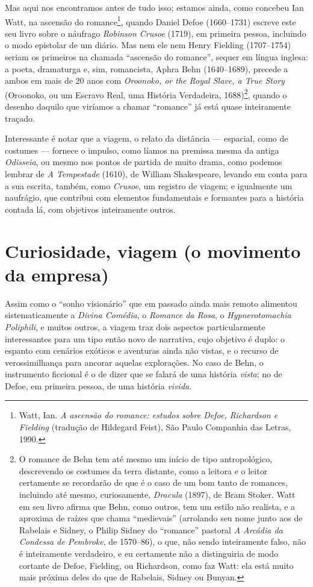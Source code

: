 Mas aqui nos encontramos antes de tudo isso; estamos ainda, como
concebeu Ian Watt, na ascensão do romance\footnote{Watt, Ian. \emph{A
  ascensão do romance: estudos sobre Defoe, Richardson e Fielding}
  (tradução de Hildegard Feist), São Paulo Companhia das Letras, 1990.},
quando Daniel Defoe (1660--1731) escreve este seu livro sobre o náufrago
\emph{Robinson Crusoe} (1719), em primeira pessoa, incluindo o modo
epistolar de um diário. Mas nem ele nem Henry Fielding (1707--1754)
seriam os primeiros na chamada ``ascensão do romance'', sequer em língua
inglesa: a poeta, dramaturga e, sim, romancista, Aphra Behn (1640--1689),
precede a ambos em mais de 20 anos com \emph{Oroonoko, or the Royal
Slave, a True Story} (Oroonoko, ou um Escravo Real, uma História
Verdadeira, 1688)\footnote{O romance de Behn tem até mesmo um início de
  tipo antropológico, descrevendo os costumes da terra distante, como a
  leitora e o leitor certamente se recordarão de que é o caso de um bom
  tanto de romances, incluindo até mesmo, curiosamente, \emph{Dracula}
  (1897), de Bram Stoker. Watt em seu livro afirma que Behn, como
  outros, tem um estilo não realista, e a aproxima de raízes que chama
  ``medievais'' (arrolando seu nome junto aos de Rabelais e Sidney, o
  Philip Sidney do ``romance'' pastoral \emph{A Arcádia da Condessa de
  Pembroke}, de 1570--86), o que, não sendo inteiramente falso, não é
  inteiramente verdadeiro, e eu certamente não a distinguiria de modo
  cortante de Defoe, Fielding, ou Richardson, como faz Watt: ela está
  muito mais próxima deles do que de Rabelais, Sidney ou Bunyan.},
quando o desenho daquilo que viríamos a chamar ``romance'' já está quase
inteiramente traçado.

Interessante é notar que a viagem, o relato da distância --- espacial,
como de costumes --- fornece o impulso, como líamos na premissa mesma da
antiga \emph{Odisseia}, ou mesmo nos pontos de partida de muito drama,
como podemos lembrar de \emph{A Tempestade} (1610), de William
Shakespeare, levando em conta para a sua escrita, também, como
\emph{Crusoe}, um registro de viagem; e igualmente um naufrágio, que
contribui com elementos fundamentais e formantes para a história contada
lá, com objetivos inteiramente outros.

\section{Curiosidade, viagem (o movimento da empresa)}

Assim como o ``sonho visionário'' que em passado ainda mais remoto
alimentou sistematicamente a \emph{Divina Comédia}, o \emph{Romance da
Rosa}, o \emph{Hypnerotomachia Poliphili}, e muitos outros, a viagem
traz dois aspectos particularmente interessantes para um tipo então novo
de narrativa, cujo objetivo é duplo: o espanto com cenários exóticos e
aventuras ainda não vistas, e o recurso de verossimilhança para ancorar
aquelas explorações. No caso de Behn, o instrumento ficcional é o de
dizer que se falará de uma história \emph{vista}; no de Defoe, em
primeira pessoa, de uma história \emph{vivida}.

